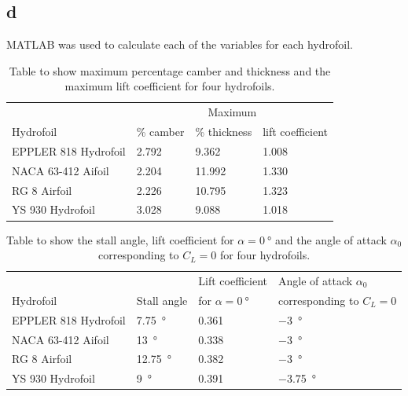 \documentclass[11pt]{article}
\numberwithin{equation}{section}
\begin{document}
\subsection{d}
MATLAB was used to calculate each of the variables for each hydrofoil.

\begin{table}[H]
    \centering
    \begin{tabular}{@{}llll@{}}
    \toprule
        & \multicolumn{3}{c}{Maximum}\\
        \cline{2-4}
        Hydrofoil& \% camber & \% thickness & lift coefficient \\
    \midrule
        EPPLER 818 Hydrofoil & 2.792 & 9.362  & 1.008 \\
        NACA 63-412 Aifoil   & 2.204 & 11.992 & 1.330 \\
        RG 8 Airfoil         & 2.226 & 10.795 & 1.323 \\
        YS 930 Hydrofoil     & 3.028 & 9.088  & 1.018 \\ 
    \bottomrule
    \end{tabular}
    \caption{Table to show maximum percentage camber and thickness and the maximum lift coefficient for four hydrofoils.}
\end{table}
\begin{table}[H]
    \centering
    \begin{tabular}{@{}llll@{}}
    \toprule
        & & Lift coefficient & Angle of attack $\alpha_0$\\
        Hydrofoil & Stall angle  & for $\alpha = \SI{0}{\degree}$ & corresponding to $C_L = 0$\\
    \midrule
        EPPLER 818 Hydrofoil & \SI{7.75}{\degree}  & 0.361 & \SI{-3}{\degree}    \\
        NACA 63-412 Aifoil   & \SI{13}{\degree}    & 0.338 & \SI{-3}{\degree}  \\
        RG 8 Airfoil         & \SI{12.75}{\degree} & 0.382 & \SI{-3}{\degree} \\
        YS 930 Hydrofoil     & \SI{9}{\degree}  & 0.391 & \SI{-3.75}{\degree}  \\ 
    \bottomrule
    \end{tabular}
    \caption{Table to show the stall angle, lift coefficient for $\alpha = \SI{0}{\degree}$ and the angle of attack $\alpha_0$ corresponding to $C_L = 0$ for four hydrofoils.}
\end{table}
\end{document}
